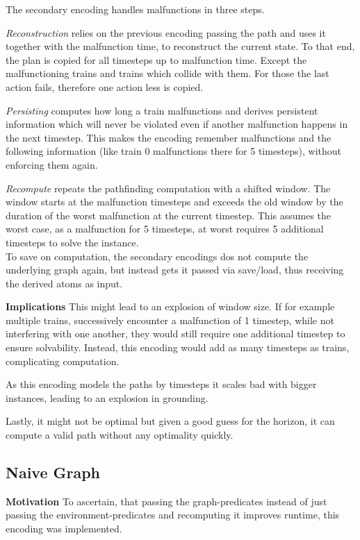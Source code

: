 \noindent The secondary encoding handles malfunctions in three steps.

\textit{Reconstruction} relies on the previous encoding passing the path and uses it together with the malfunction time, to reconstruct the current state. To that end, the plan is copied for all timesteps up to malfunction time. Except the malfunctioning trains and trains which collide with them. For those the last action fails, therefore one action less is copied. 

\textit{Persisting} computes how long a train malfunctions and derives persistent information which will never be violated even if another malfunction happens in the next timestep. This makes the encoding remember malfunctions and the following information (like train 0 malfunctions there for 5 timesteps), without enforcing them again.

\textit{Recompute} repeats the pathfinding computation with a shifted window. The window starts at the malfunction timesteps and exceeds the old window by the duration of the worst malfunction at the current timestep. This assumes the worst case, as a malfunction for 5 timesteps, at worst requires 5 additional timesteps to solve the instance.\\

To save on computation, the secondary encodings dos not compute the underlying graph again, but instead gets it passed via save/load, thus receiving the derived atoms as input.

\noindent \textbf{Implications} This might lead to an explosion of window size. If for example multiple trains, successively encounter a malfunction of 1 timestep, while not interfering with one another, they would still require one additional timestep to ensure solvability. Instead, this encoding would add as many timesteps as trains, complicating computation.

As this encoding models the paths by timesteps it scales bad with bigger instances, leading to an explosion in grounding.

Lastly, it might not be optimal but given a good guess for the horizon, it can compute a valid path without any optimality quickly.

\subsection{Naive Graph}
\noindent \textbf{Motivation} To ascertain, that passing the graph-predicates instead of just passing the environment-predicates and recomputing it improves runtime, this encoding was implemented.\\

